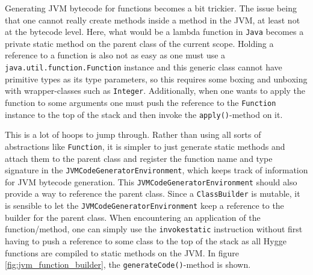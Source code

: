 Generating JVM bytecode for functions becomes a bit trickier. The issue being that one cannot really create methods inside a method in the JVM,
at least not at the bytecode level. Here, what would be a lambda function in \texttt{Java} becomes a private static method on the parent class
of the current scope. Holding a reference to a function is also not as easy as one must use a \texttt{java.util.function.Function}\cite{java_function} instance and
this generic class cannot have primitive types as its type parameters, so this requires some boxing and unboxing with wrapper-classes such as \texttt{Integer}.
Additionally, when one wants to apply the function to some arguments one must push the reference to the \texttt{Function} instance to the top of
the stack and then invoke the \texttt{apply()}-method on it.

This is a lot of hoops to jump through. Rather than using all sorts of abstractions like \texttt{Function}, it is simpler to just generate static
methods and attach them to the parent class and register the function name and type signature in the \texttt{JVMCodeGeneratorEnvironment}, which
keeps track of information for JVM bytecode generation. This \texttt{JVMCodeGeneratorEnvironment} should also provide a way to reference the
parent class. Since a \texttt{ClassBuilder} is mutable, it is
sensible to let the \texttt{JVMCodeGeneratorEnvironment} keep a reference to the builder for the parent class. When encountering
an application of the function/method, one can simply use the \texttt{invokestatic}\cite{jvm_spec} instruction without first having to push a reference
to some class to the top of the stack as all Hygge functions are compiled to static methods on the JVM. In figure \ref{fig:jvm_function_builder}, the \texttt{generateCode()}-method is shown.

